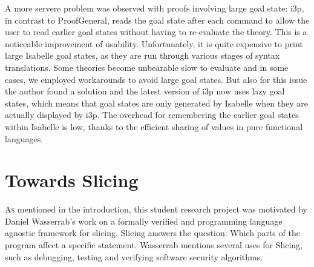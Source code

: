 \documentclass[a4paper,parskip=half,BCOR=8mm,DIV=calc,12pt]{scrbook}
\begin{document}
A more servere problem was observed with proofs involving large goal state: i3p, in contrast to ProofGeneral, reads the goal state after each command to allow the user to read earlier goal states without having to re-evaluate the theory. This is a noticeable improvement of usability. Unfortunately, it is quite expensive to print large Isabelle goal states, as they are run through various stages of syntax translations. Some theories become unbearable slow to evaluate and in some cases, we employed workarounds to avoid large goal states. But also for this issue the author found a solution and the latest version of i3p now uses lazy goal states, which means that goal states are only generated by Isabelle when they are actually displayed by i3p. The overhead for remembering the earlier goal states within Isabelle is low, thanks to the efficient sharing of values in pure functional languages. 


\chapter{Towards Slicing}
\label{chapslicing}

\lettrine[lines=3]As mentioned in the introduction, this student research project was motivated by Daniel Wasserrab’s work on a formally verified and programming language agnostic framework for slicing. Slicing answers the question: Which parts of the program affect a specific statement. Wasserrab mentions several uses for Slicing, such as debugging, testing and verifying software security algorithms.
\end{document}
